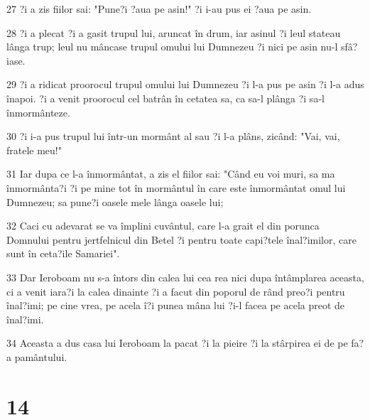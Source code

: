 \par 27 ?i a zis fiilor sai: "Pune?i ?aua pe asin!" ?i i-au pus ei ?aua pe asin.
\par 28 ?i a plecat ?i a gasit trupul lui, aruncat în drum, iar asinul ?i leul stateau lânga trup; leul nu mâncase trupul omului lui Dumnezeu ?i nici pe asin nu-l sfâ?iase.
\par 29 ?i a ridicat proorocul trupul omului lui Dumnezeu ?i l-a pus pe asin ?i l-a adus înapoi. ?i a venit proorocul cel batrân în cetatea sa, ca sa-l plânga ?i sa-l înmormânteze.
\par 30 ?i i-a pus trupul lui într-un mormânt al sau ?i l-a plâns, zicând: "Vai, vai, fratele meu!"
\par 31 Iar dupa ce l-a înmormântat, a zis el fiilor sai: "Când eu voi muri, sa ma înmormânta?i ?i pe mine tot în mormântul în care este înmormântat omul lui Dumnezeu; sa pune?i oasele mele lânga oasele lui;
\par 32 Caci cu adevarat se va împlini cuvântul, care l-a grait el din porunca Domnului pentru jertfelnicul din Betel ?i pentru toate capi?tele înal?imilor, care sunt în ceta?ile Samariei".
\par 33 Dar Ieroboam nu s-a întors din calea lui cea rea nici dupa întâmplarea aceasta, ci a venit iara?i la calea dinainte ?i a facut din poporul de rând preo?i pentru înal?imi; pe cine vrea, pe acela î?i punea mâna lui ?i-l facea pe acela preot de înal?imi.
\par 34 Aceasta a dus casa lui Ieroboam la pacat ?i la pieire ?i la stârpirea ei de pe fa?a pamântului.

\chapter{14}

